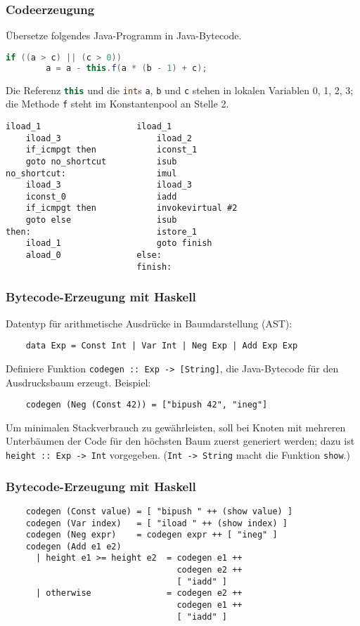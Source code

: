 \documentclass{beamer}
\begin{document}
\begin{frame}[fragile]
  \frametitle{Codeerzeugung}
  Übersetze folgendes Java-Programm in Java-Bytecode.
  \begin{lstlisting}[language=Java]
    if ((a > c) || (c > 0))
        a = a - this.f(a * (b - 1) + c);
  \end{lstlisting}
  Die Referenz \lstinline[language=Java]{this} und die \lstinline[language=Java]{int}s \lstinline{a}, \lstinline{b} und \lstinline{c} stehen in lokalen Variablen 0, 1, 2, 3;
  die Methode \lstinline{f} steht im Konstantenpool an Stelle 2.
  \pause
  \begin{lstlisting}[language=jasmin,autogobble=false]
    iload_1                   iload_1           
    iload_3                   iload_2           
    if_icmpgt then            iconst_1          
    goto no_shortcut          isub              
no_shortcut:                  imul              
    iload_3                   iload_3           
    iconst_0                  iadd              
    if_icmpgt then            invokevirtual #2  
    goto else                 isub              
then:                         istore_1          
    iload_1                   goto finish       
    aload_0               else:                 
                          finish:
  \end{lstlisting}
\end{frame}

\begin{frame}[fragile]
  \frametitle{Bytecode-Erzeugung mit Haskell}
  \lstset{language=Haskell}
  Datentyp für arithmetische Ausdrücke in Baumdarstellung (AST):
  \begin{lstlisting}
    data Exp = Const Int | Var Int | Neg Exp | Add Exp Exp
  \end{lstlisting}
  Definiere Funktion \lstinline{codegen :: Exp -> [String]}, die Java-Bytecode für den Ausdrucksbaum erzeugt. Beispiel:
  \begin{lstlisting}
    codegen (Neg (Const 42)) = ["bipush 42", "ineg"]
  \end{lstlisting}
  Um minimalen Stackverbrauch zu gewährleisten, soll bei Knoten mit mehreren Unterbäumen der Code für den höchsten Baum zuerst generiert werden;
  dazu ist \lstinline{height :: Exp -> Int} vorgegeben.
  (\lstinline{Int -> String} macht die Funktion \lstinline{show}.)
\end{frame}

\begin{frame}[fragile]
  \frametitle{Bytecode-Erzeugung mit Haskell}
  \lstset{language=Haskell}
  \begin{lstlisting}
    codegen (Const value) = [ "bipush " ++ (show value) ]
    codegen (Var index)   = [ "iload " ++ (show index) ]
    codegen (Neg expr)    = codegen expr ++ [ "ineg" ]
    codegen (Add e1 e2)
      | height e1 >= height e2  = codegen e1 ++
                                  codegen e2 ++
                                  [ "iadd" ]
      | otherwise               = codegen e2 ++
                                  codegen e1 ++
                                  [ "iadd" ]
  \end{lstlisting}
\end{frame}
\end{document}
